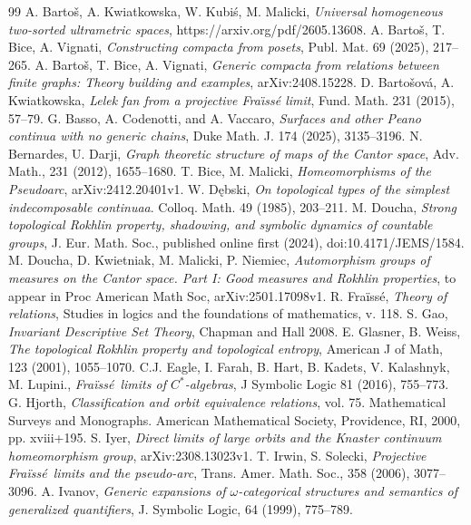 \documentclass[12pt]{amsart}
\numberwithin{equation}{section}
\theoremstyle{plain}
\theoremstyle{definition}
\newcommand \fra{Fra\"{i}ss\'{e}}
\begin{document}
\begin{thebibliography}{99}
	 A. Barto\v s, A. Kwiatkowska, W. Kubiś, M. Malicki, \emph{Universal homogeneous two-sorted ultrametric spaces}, https://arxiv.org/pdf/2605.13608.
	 A. Barto\v s, T. Bice, A. Vignati,  \emph{Constructing compacta from posets}, Publ. Mat. 69 (2025), 217--265.
	 A. Barto\v s, T. Bice, A. Vignati, \emph{Generic compacta from relations between finite graphs: Theory building and examples}, arXiv:2408.15228.
	 D. Barto\v{s}ov\'a, A. Kwiatkowska, \emph{Lelek fan from a projective Fra\"{\i}ss\'e limit}, Fund. Math. 231 (2015), 57--79.
	 G. Basso, A. Codenotti, and A. Vaccaro, \emph{Surfaces and other Peano continua with no generic chains}, Duke Math. J. 174 (2025), 3135--3196.
	 N. Bernardes, U. Darji,  \emph{Graph theoretic structure of maps of the Cantor space}, Adv. Math., 231 (2012), 1655--1680.
	 	T. Bice, M. Malicki, \emph{Homeomorphisms of the Pseudoarc},  arXiv:2412.20401v1.
	 W. Dębski, \emph{On topological types of the simplest indecomposable continuaa}. Colloq. Math. 49 (1985), 203--211.
	 M. Doucha, \emph{Strong topological Rokhlin property, shadowing, and symbolic dynamics of countable groups}, J. Eur. Math. Soc., published online first (2024), doi:10.4171/JEMS/1584.
	 M. Doucha, D. Kwietniak, M. Malicki, P. Niemiec, \emph{Automorphism groups of measures on the Cantor space. Part I: Good measures and Rokhlin properties}, to appear in Proc American Math Soc, arXiv:2501.17098v1.
	 R. \fra , \emph{Theory of relations}, Studies in logics and the foundations of mathematics, v. 118.
	 S. Gao, \emph{Invariant Descriptive Set Theory}, Chapman and Hall 2008.
	 E. Glasner, B. Weiss, \emph{The topological Rokhlin property and topological entropy}, American J of Math, 123 (2001), 1055--1070. 
	 C.J. Eagle, I. Farah, B. Hart, B. Kadets, V. Kalashnyk, M. Lupini., \emph{\fra \ limits of $C^*$-algebras}, J Symbolic Logic 81 (2016), 755--773.
	 G. Hjorth, \emph{Classification and orbit equivalence relations}, vol. 75. Mathematical Surveys and Monographs. American Mathematical Society, Providence, RI, 2000, pp. xviii+195.
	 S. Iyer, \emph{Direct limits of large orbits and the Knaster continuum homeomorphism group}, arXiv:2308.13023v1. 
	 T. Irwin, S. Solecki, \emph{Projective \fra \ limits and the
	pseudo-arc}, Trans. Amer. Math. Soc., 358 (2006), 3077--3096.
	 A. Ivanov, \emph{Generic expansions of $\omega$-categorical structures and semantics of generalized quantifiers}, J. Symbolic Logic, 64 (1999), 775--789.

\end{thebibliography}
\end{document}
